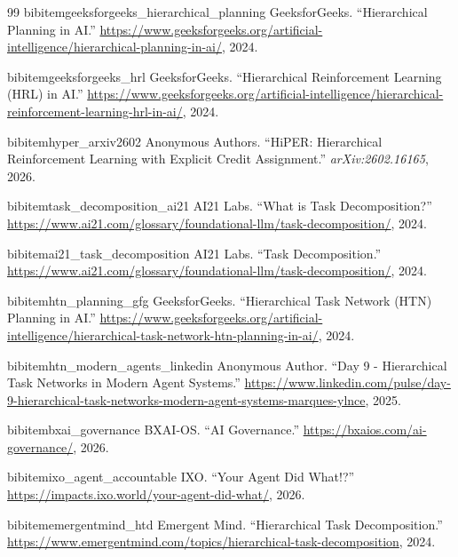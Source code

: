 \begin{thebibliography}{99}
 bibitem{geeksforgeeks_hierarchical_planning}
 GeeksforGeeks.
 ``Hierarchical Planning in AI.'' 
 \url{https://www.geeksforgeeks.org/artificial-intelligence/hierarchical-planning-in-ai/}, 2024.

 bibitem{geeksforgeeks_hrl}
 GeeksforGeeks.
 ``Hierarchical Reinforcement Learning (HRL) in AI.'' 
 \url{https://www.geeksforgeeks.org/artificial-intelligence/hierarchical-reinforcement-learning-hrl-in-ai/}, 2024.

 bibitem{hyper_arxiv2602}
 Anonymous Authors.
 ``HiPER: Hierarchical Reinforcement Learning with Explicit Credit Assignment.'' 
 \emph{arXiv:2602.16165}, 2026.

 bibitem{task_decomposition_ai21}
 AI21 Labs.
 ``What is Task Decomposition?'' 
 \url{https://www.ai21.com/glossary/foundational-llm/task-decomposition/}, 2024.

 bibitem{ai21_task_decomposition}
 AI21 Labs.
 ``Task Decomposition.'' 
 \url{https://www.ai21.com/glossary/foundational-llm/task-decomposition/}, 2024.

 bibitem{htn_planning_gfg}
 GeeksforGeeks.
 ``Hierarchical Task Network (HTN) Planning in AI.'' 
 \url{https://www.geeksforgeeks.org/artificial-intelligence/hierarchical-task-network-htn-planning-in-ai/}, 2024.

 bibitem{htn_modern_agents_linkedin}
 Anonymous Author.
 ``Day 9 - Hierarchical Task Networks in Modern Agent Systems.'' 
 \url{https://www.linkedin.com/pulse/day-9-hierarchical-task-networks-modern-agent-systems-marques-ylnce}, 2025.

 bibitem{bxai_governance}
 BXAI-OS.
 ``AI Governance.'' 
 \url{https://bxaios.com/ai-governance/}, 2026.

 bibitem{ixo_agent_accountable}
 IXO.
 ``Your Agent Did What!?'' 
 \url{https://impacts.ixo.world/your-agent-did-what/}, 2026.

 bibitem{emergentmind_htd}
 Emergent Mind.
 ``Hierarchical Task Decomposition.'' 
 \url{https://www.emergentmind.com/topics/hierarchical-task-decomposition}, 2024.

\end{thebibliography}